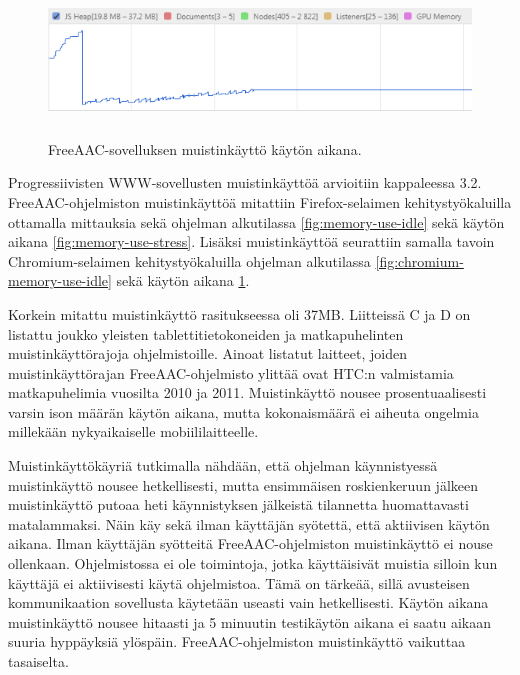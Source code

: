 \documentclass[utf8]{gradu3}
\begin{document}
\begin{figure}[h]\centering
  \includegraphics[height=4cm,keepaspectratio]{chromium-memory-use-stress}
  \caption[FreeAAC-sovelluksen muistinkäyttö käytön aikana graafina.]
  {FreeAAC-sovelluksen muistinkäyttö käytön aikana.}
  \label{fig:chromium-memory-use-stress}
\end{figure}

Progressiivisten WWW-sovellusten muistinkäyttöä arvioitiin kappaleessa 3.2. FreeAAC-ohjelmiston muistinkäyttöä mitattiin Firefox-selaimen kehitystyökaluilla ottamalla mittauksia sekä ohjelman alkutilassa \ref{fig:memory-use-idle} sekä käytön aikana \ref{fig:memory-use-stress}. Lisäksi muistinkäyttöä seurattiin samalla tavoin Chromium-selaimen kehitystyökaluilla ohjelman alkutilassa \ref{fig:chromium-memory-use-idle} sekä käytön aikana \ref{fig:chromium-memory-use-stress}. 

Korkein mitattu muistinkäyttö rasitukseessa oli 37MB. Liitteissä C ja D on listattu joukko yleisten tablettitietokoneiden ja matkapuhelinten muistinkäyttörajoja ohjelmistoille. Ainoat listatut laitteet, joiden muistinkäyttörajan FreeAAC-ohjelmisto ylittää ovat HTC:n valmistamia matkapuhelimia vuosilta 2010 ja 2011. Muistinkäyttö nousee prosentuaalisesti varsin ison määrän käytön aikana, mutta kokonaismäärä ei aiheuta ongelmia millekään nykyaikaiselle mobiililaitteelle.

Muistinkäyttökäyriä tutkimalla nähdään, että ohjelman käynnistyessä muistinkäyttö nousee hetkellisesti, mutta ensimmäisen roskienkeruun jälkeen muistinkäyttö putoaa heti käynnistyksen jälkeistä tilannetta huomattavasti matalammaksi. Näin käy sekä ilman käyttäjän syötettä, että aktiivisen käytön aikana. Ilman käyttäjän syötteitä FreeAAC-ohjelmiston muistinkäyttö ei nouse ollenkaan. Ohjelmistossa ei ole toimintoja, jotka käyttäisivät muistia silloin kun käyttäjä ei aktiivisesti käytä ohjelmistoa. Tämä on tärkeää, sillä avusteisen kommunikaation sovellusta käytetään useasti vain hetkellisesti. Käytön aikana muistinkäyttö nousee hitaasti ja 5 minuutin testikäytön aikana ei saatu aikaan suuria hyppäyksiä ylöspäin. FreeAAC-ohjelmiston muistinkäyttö vaikuttaa tasaiselta.
\end{document}
